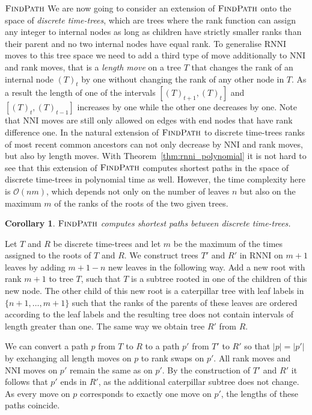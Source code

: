 \documentclass[11pt]{amsart}
\newtheorem{corollary}{Corollary}
\newcommand{\rnni}{\mathrm{RNNI}}
\newcommand{\findpath}{\textsc{FindPath}}
\newcommand{\nni}{\mathrm{NNI}}
\renewcommand{\O}{\mathcal O}
\newcommand{\summary}[1]{} %
\begin{document}
\summary{Generalising} $\findpath$ \summary{for discrete time-trees}
We are now going to consider an extension of $\findpath$ onto the space of \emph{discrete time-trees}, which are trees where the rank function can assign any integer to internal nodes as long as children have strictly smaller ranks than their parent and no two internal nodes have equal rank.
To generalise $\rnni$ moves to this tree space we need to add a third type of move additionally to $\nni$ and rank moves, that is a \emph{length move} on a tree $T$ that changes the rank of an internal node $(T)_t$ by one without changing the rank of any other node in $T$.
As a result the length of one of the intervals $[(T)_{t+1},(T)_t]$ and $[(T)_t,(T)_{t-1}]$ increases by one while the other one decreases by one.
Note that $\nni$ moves are still only allowed on edges with end nodes that have rank difference one.
In the natural extension of $\findpath$ to discrete time-trees ranks of most recent common ancestors can not only decrease by $\nni$ and rank moves, but also by length moves.
With Theorem~\ref{thm:rnni_polynomial} it is not hard to see that this extension of $\findpath$ computes shortest paths in the space of discrete time-trees in polynomial time as well.
However, the time complexity here is $\O(nm)$, which depends not only on the number of leaves $n$ but also on the maximum $m$ of the ranks of the roots of the two given trees.
\begin{corollary}
	$\findpath$ computes shortest paths between discrete time-trees.
\end{corollary}

\proof
	Let $T$ and $R$ be discrete time-trees and let $m$ be the maximum of the times assigned to the roots of $T$ and $R$.
	We construct trees $T'$ and $R'$ in $\rnni$ on $m + 1$ leaves by adding $m + 1 - n$ new leaves in the following way.
	Add a new root with rank $m+1$ to tree $T$, such that $T$ is a subtree rooted in one of the children of this new node.
	The other child of this new root is a caterpillar tree with leaf labels in $\{n+1, \ldots, m+1\}$ such that the ranks of the parents of these leaves are ordered according to the leaf labels and the resulting tree does not contain intervals of length greater than one.
	The same way we obtain tree $R'$ from $R$.

	We can convert a path $p$ from $T$ to $R$ to a path $p'$ from $T'$ to $R'$ so that $|p| = |p'|$ by exchanging all length moves on $p$ to rank swaps on $p'$.
	All rank moves and $\nni$ moves on $p'$ remain the same as on $p'$.
	By the construction of $T'$ and $R'$ it follows that $p'$ ends in $R'$, as the additional caterpillar subtree does not change.
	As every move on $p$ corresponds to exactly one move on $p'$, the lengths of these paths coincide.
\end{document}
